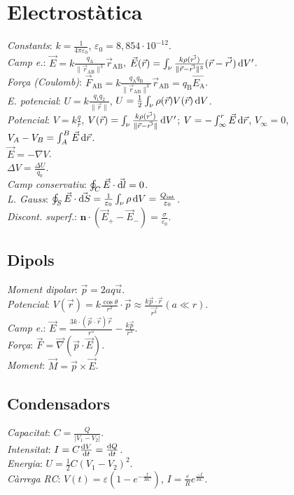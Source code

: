 \section{Electrostàtica} 
\emph{Constants}: $k=\frac{1}{4\pi\varepsilon_0}$, $\varepsilon_0=8,854\cdot 10^{-12}$. \\ 
\emph{Camp e.}: $\vec{E} = k\frac{q_\text{A}}{\|\vec{r}_{\text{AB}}\|^3}\vec{r}_{\text{AB}}$, $\vec{E}(\vec{r}) = \int_\nu \frac{k\rho(\vec{r'})}{\|\vec{r}-\vec{r'}\|^3}(\vec{r}-\vec{r'}) \dif V'$. \\ 
\emph{Força (Coulomb)}: $\vec{F}_{\text{AB}} = k\frac{q_{\text{A}}q_{\text{B}}}{\|\vec{r}_{\text{AB}}\|^3}\vec{r}_{\text{AB}}=q_\text{B}\vec{E_\text{A}}$. \\ 
\emph{E. potencial}: $U = k\frac{q_1q_2}{\|\vec{r}\|}$, $U = \frac{1}{2}\int_\nu \rho(\vec{r})V(\vec{r})\dif V$. \\
\emph{Potencial}: $V = k \frac{q}{r}$, $V(\vec{r}) = \int_\nu \frac{k\rho(\vec{r'})}{\|\vec{r}-\vec{r'}\|}\dif V'$; $V=-\int_{\infty}^r \vec{E} \dif \vec{r}$, $V_{\infty}=0$, $V_A -V_B = \int_A^B \vec{E} \dif \vec{r}$. \\
\ci $\vec{E}=-\nabla V$. \\
\ci $\Delta V = \frac{\Delta U}{q_0}$. \\
\emph{Camp conservatiu}: $\oint_C \vec{E} \cdot \vec{\dif l} = 0$. \\
\emph{L. Gauss}: $\oint_S \vec{E}\cdot \vec{\dif S} = \frac{1}{\varepsilon_0} \int_\nu \rho \dif V = \frac{Q_\text{int}}{\varepsilon_0}$.\\
\emph{Discont. superf.}: $\boldsymbol{n} \cdot (\vec{E}_+ - \vec{E}_-) = \frac{\sigma}{\varepsilon_0}$.

\subsection{Dipols}
\emph{Moment dipolar}: $\vec{p} = 2aq\vec{u}$. \\
\emph{Potencial}: $V(\vec{r}) = k\frac{\cos \theta}{r^2}\cdot \vec{p} \approx \frac{k\vec{p}\cdot\vec{r}}{\vec{r^3}} (a \ll r)$. \\
\emph{Camp e.}: $\vec{E} = \frac{3k\cdot (\vec{p}\cdot\vec{r})\vec{r}}{r^5} - \frac{k\vec{p}}{r^3}$. \\
\emph{Força}: $\vec{F} = \vec{\nabla}(\vec{p}\cdot \vec{E})$. \\
\emph{Moment}: $\vec{M} = \vec{p}\times \vec{E}$.



\subsection{Condensadors}
\emph{Capacitat}: $C = \frac{Q}{|V_1-V_2|}$. \\
\emph{Intensitat}: $I=C\frac{\dif V}{\dif t} = \frac{\dif Q}{\dif t}$.\\
\emph{Energia}: $U = \frac{1}{2}C (V_1-V_2)^2$.\\
\emph{Càrrega RC}: $V(t) = \varepsilon (1 -  e^{-\frac{t}{RC}})$, 
                    $I = \frac{\varepsilon}{R} e^{\frac{-t}{RC}}$.

